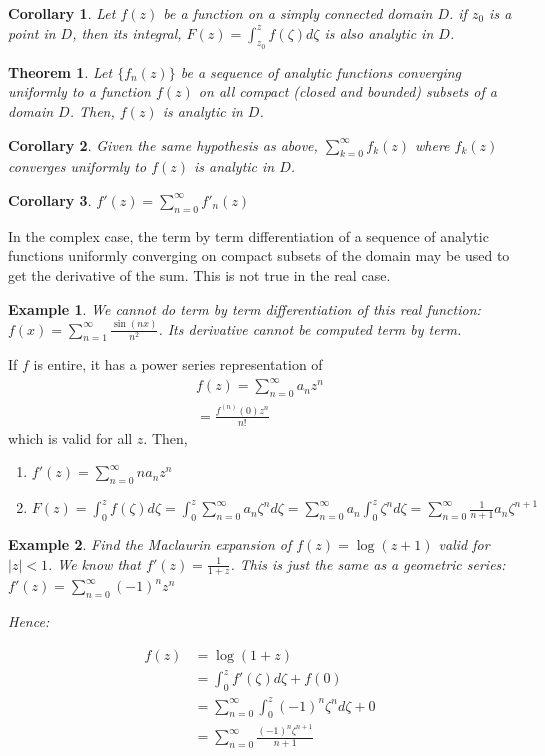 \documentclass{article}
\newtheorem{theorem}{Theorem}[section]
\newtheorem{corollary}{Corollary}
\newtheorem{ex}{Example}
\theoremstyle{definition}
\begin{document}
\begin{corollary}
Let $f(z)$ be a function on a simply connected domain $D$. if $z_0$ is a point in $D$, then its integral, $F(z) = \int_{z_0}^z f(\zeta)d\zeta $ is also analytic in $D$. 
\end{corollary}
\begin{theorem}
Let $\{f_n(z)\}$ be a sequence of analytic functions converging uniformly to a function $f(z)$ on all compact (closed and bounded) subsets of a domain $D$. Then, $f(z)$ is analytic in $D$. 
\end{theorem}

\begin{corollary}
Given the same hypothesis as above, $\sum_{k=0}^\infty f_k(z)$ where $f_k(z)$ converges uniformly to $f(z)$ is analytic in $D$.
\end{corollary}

\begin{corollary}
$f'(z) = \sum_{n=0}^\infty f'_n(z)$
\end{corollary}

In the complex case, the term by term differentiation of a sequence of analytic functions uniformly converging on  compact subsets of the domain may be used to get the derivative of the sum. This is not true in the real case.

\begin{ex}
We cannot do term by term differentiation of this real function:
$f(x) = \sum_{n=1}^\infty \frac{\sin(nx)}{n^2}$. Its derivative cannot be computed term by term.
\end{ex}

If $f$ is entire, it has a power series representation of 
\begin{align*}
f(z) = \sum_{n=0}^\infty a_n z^n \\ 
 = \frac{f^(n)(0) z^n}{n!}
\end{align*}
which is valid for all $z$. Then, 

\begin{enumerate}
	\item $f'(z) = \sum_{n=0}^\infty n a_n z^n $
	\item $F(z) = \int_{0}^zf(\zeta)d\zeta = \int_0^z \sum_{n=0}^\infty  a_n \zeta^n d\zeta =\sum_{n=0}^\infty  a_n \int_0^z  \zeta^n d\zeta = \sum_{n=0}^\infty  \frac{1}{n+1} a_n\zeta^{n+1}  $
\end{enumerate}

\begin{ex}
Find the Maclaurin expansion of $f(z) = \log(z+1)$ valid for $|z|<1$. We know that $f'(z) = \frac{1}{1+z}$. This is just the same as a geometric series: $f'(z) = \sum_{n=0}^\infty (-1)^n z^n$

Hence:

\begin{align*}
f(z) &= \log(1+z) \\ 
& = \int_{0}^z f'(\zeta) d\zeta + f(0) \\ 
& = \sum_{n=0}^\infty \int_{0}^z (-1)^n\zeta^n d\zeta + 0 \\ 
&  = \sum_{n=0}^\infty \frac{(-1)^n\zeta^{n+1}}{n+1}  
\end{align*}
\end{ex}
\end{document}
